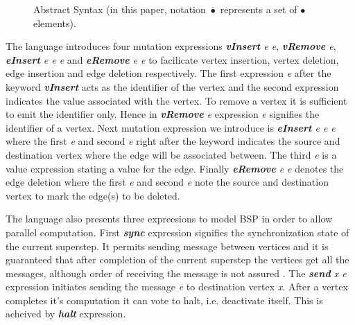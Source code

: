 \begin{figure}[h]
\begin{center}
\end{center}
\caption{Abstract Syntax (in this paper, notation
$\overline{\bullet}$ represents a set of $\bullet$ elements).}
\label{fig-syntax}
\end{figure}


The language introduces four mutation expressions \emph{\textbf{vInsert} e e}, \emph{\textbf{vRemove} e}, \emph{\textbf{eInsert} e e e} and \emph{\textbf{eRemove} e e} to facilicate vertex insertion, vertex deletion, edge insertion and edge deletion respectively. The first expression \emph{e} after the keyword \emph{\textbf{vInsert}} acts as the identifier of the vertex and the second expression indicates the value associated with the vertex. To remove a vertex it is sufficient to emit the identifier only. Hence in \emph{\textbf{vRemove} e} expression \emph{e} signifies the identifier of a vertex. Next mutation expression we introduce is \emph{\textbf{eInsert} e e e} where the first \emph{e} and second \emph{e} right after the keyword indicates the source and destination vertex where the edge will be associated between. The third \emph{e} is a value expression stating a value for the edge. Finally \emph{\textbf{eRemove} e e} denotes the edge deletion where the first \emph{e} and second \emph{e} note the source and destination vertex to mark the edge(s) to be deleted.


The language also presents three expreesions to model BSP in order to allow parallel computation. First \emph{\textbf{sync}} expression signifies the synchronization state of the current superstep. It permits sending message between vertices and it is guaranteed that after completion of the current superstep the vertices get all the messages, although order of receiving the message is not assured \cite{Pregel2010}. The \emph{\textbf{send} x e} expression initiates sending the message \emph{e} to destination vertex \emph{x}. After a vertex completes it's computation it can vote to halt, i.e. deactivate itself. This is acheived by \emph{\textbf{halt}} expression.

